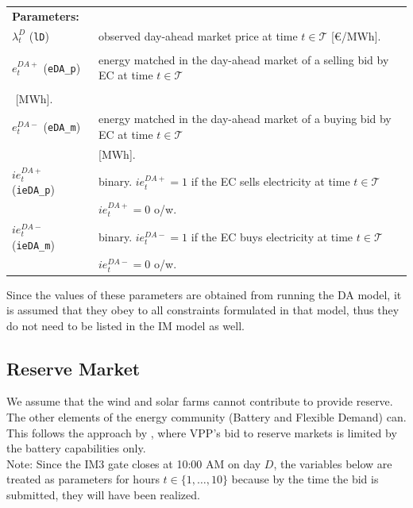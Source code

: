 \documentclass{article}
\begin{document}
\begin{tabularx}{\textwidth}{l l}

	\\
    \textbf{Parameters:} \\
	$\lambda^{D}_{t}$ (\verb|lD|) & observed  day-ahead market price at time $t \in \mathcal{T}$  [\euro/MWh]. \\
       \\
	$e^{DA+}_{t}$ (\verb|eDA_p|) & energy matched in the day-ahead market of a selling bid by EC at time $t \in \mathcal{T}$ \\
    \\
	$ $ [MWh]. \\
    
	$e^{DA-}_{t}$ (\verb|eDA_m|) & energy matched in the day-ahead market of a buying bid by EC at time $t \in \mathcal{T}$ \\
	& [MWh]. 
    \\
    $ie^{DA+}_{t}$ (\verb|ieDA_p|) & binary. $ie^{DA+}_{t} = 1$ if the EC sells electricity at time $t \in \mathcal{T}$ \\
	& $ie^{DA+}_{t} = 0$ o/w. \\
	$ie^{DA-}_{t}$ (\verb|ieDA_m|) & binary. $ie^{DA-}_{t} = 1$ if the EC buys electricity at time $t \in \mathcal{T}$ \\
	& $ie^{DA-}_{t} = 0$ o/w.
\end{tabularx}

Since the values of these parameters are obtained from running the DA model, it is assumed that they obey to all constraints formulated in that model, thus they do not need to be listed in the IM model as well.

\subsection{Reserve Market}
We assume that the wind and solar farms cannot contribute to provide reserve. The other elements of the energy community (Battery and Flexible Demand) can. This follows the approach by \textcite{Heredia et. al.}, where VPP's bid to reserve markets is limited by the battery capabilities only. \\
Note: Since the IM3 gate closes at 10:00 AM on day $D$, the variables below are treated as parameters for hours $t \in \{1,\dots,10\}$ because by the time the bid is submitted, they will have been realized.

\end{document}
